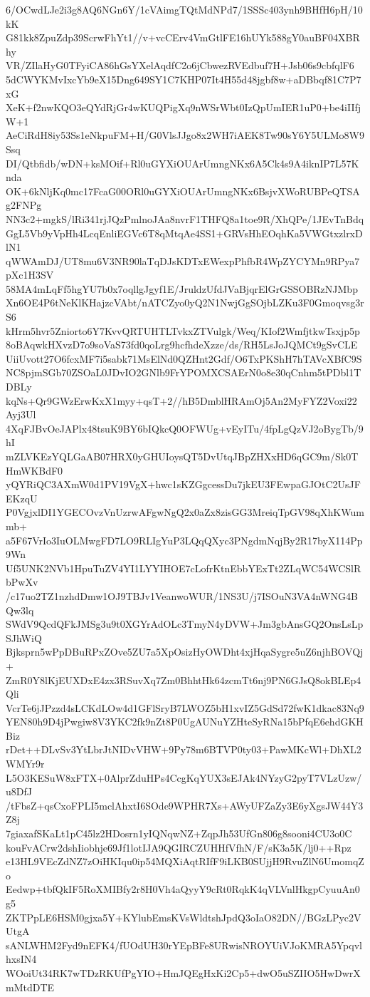 6/OCwdLJe2i3g8AQ6NGn6Y/1cVAimgTQtMdNPd7/1SSSc403ynh9BHfH6pH/10kK
G81kk8ZpuZdp39ScrwFhYt1//v+vcCErv4VmGtlFE16hUYk588gY0auBF04XBRhy
VR/ZIlaHyG0TFyiCA86hGsYXelAqdfC2o6jCbwezRVEdbuf7H+Jsb06s9cbfqlF6
5dCWYKMvIxcYb9eX15Dng649SY1C7KHP07It4H55d48jgbf8w+aDBbqf81C7P7xG
XeK+f2nwKQO3eQYdRjGr4wKUQPigXq9nWSrWbt0IzQpUmIER1uP0+be4iIIfjW+1
AeCiRdH8iy53Ss1eNkpuFM+H/G0VlsJJgo8x2WH7iAEK8Tw90sY6Y5ULMo8W9Ssq
DI/Qtbfidb/wDN+ksMOif+Rl0uGYXiOUArUmngNKx6A5Ck4s9A4iknIP7L57Knda
OK+6kNljKq0mc17FcaG00ORl0uGYXiOUArUmngNKx6BsjvXWoRUBPeQTSAg2FNPg
NN3c2+mgkS/lRi341rjJQzPmlnoJAa8nvrF1THFQ8a1toe9R/XhQPe/1JEvTnBdq
GgL5Vb9yVpHh4LcqEnliEGVc6T8qMtqAe4SS1+GRVsHhEOqhKa5VWGtxzlrxDlN1
qWWAmDJ/UT8mu6V3NR90laTqDJsKDTxEWexpPhfbR4WpZYCYMn9RPya7pXc1H3SV
58MA4mLqFf5hgYU7b0x7oqllgJgyf1E/JruldzUfdJVaBjqrElGrGSSOBRzNJMbp
Xn6OE4P6tNeKlKHajzcVAbt/nATCZyo0yQ2N1NwjGgSOjbLZKu3F0Gmoqvsg3rS6
kHrm5hvr5Zniorto6Y7KvvQRTUHTLTvkxZTVulgk/Weq/KIof2WmfjtkwTsxjp5p
8oBAqwkHXvzD7o9soVaS73fd0qoLrg9hcfhdeXzze/ds/RH5LsJoJQMCt9gSvCLE
UiiUvott27O6fcxMF7i5sabk71MsElNd0QZHnt2Gdf/O6TxPKShH7hTAVcXBfC9S
NC8pjmSGb70ZSOaL0JDvIO2GNlb9FrYPOMXCSAErN0o8e30qCnhm5tPDbl1TDBLy
kqNs+Qr9GWzErwKxX1myy+qsT+2//hB5DmblHRAmOj5An2MyFYZ2Voxi22Ayj3Ul
4XqFJBvOeJAPlx48tsuK9BY6bIQkcQ0OFWUg+vEyITu/4fpLgQzVJ2oBygTb/9hI
mZLVKEzYQLGaAB07HRX0yGHUIoysQT5DvUtqJBpZHXxHD6qGC9m/Sk0THmWKBdF0
yQYRiQC3AXmW0d1PV19VgX+hwc1sKZGgcessDu7jkEU3FEwpaGJOtC2UsJFEKzqU
P0VgjxlDI1YGECOvzVnUzrwAFgwNgQ2x0aZx8zisGG3MreiqTpGV98qXhKWummb+
a5F67VrIo3IuOLMwgFD7LO9RLIgYuP3LQqQXyc3PNgdmNqjBy2R17byX114Pp9Wn
Uf5UNK2NVb1HpuTuZV4YI1LYYIHOE7cLofrKtnEbbYExTt2ZLqWC54WCSlRbPwXv
/c17uo2TZ1nzhdDmw1OJ9TBJv1VeanwoWUR/1NS3U/j7ISOuN3VA4nWNG4BQw3lq
SWdV9QcdQFkJMSg3u9t0XGYrAdOLc3TmyN4yDVW+Jm3gbAnsGQ2OnsLsLpSJhWiQ
Bjksprn5wPpDBuRPxZOve5ZU7a5XpOsizHyOWDht4xjHqaSygre5uZ6njhBOVQj+
ZmR0Y8lKjEUXDxE4zx3RSuvXq7Zm0BhhtHk64zcmTt6nj9PN6GJsQ8okBLEp4Qli
VcrTe6jJPzzd4sLCKdLOw4d1GFlSryB7LWOZ5bH1xvIZ5GdSd72fwK1dkac83Nq9
YEN80h9D4jPwgiw8V3YKC2fk9nZt8P0UgAUNuYZHteSyRNa15bPfqE6ehdGKHBiz
rDet++DLvSv3YtLbrJtNIDvVHW+9Py78m6BTVP0ty03+PawMKcWl+DhXL2WMYr9r
L5O3KESuW8xFTX+0AlprZduHPs4CcgKqYUX3sEJAk4NYzyG2pyT7VLzUzw/u8DfJ
/tFbsZ+qsCxoFPLI5mclAhxtI6SOde9WPHR7Xs+AWyUFZaZy3E6yXgsJW44Y3Z8j
7giaxafSKaLt1pC45lz2HDosrn1yIQNqwNZ+ZqpJh53UfGn806g8sooni4CU3o0C
kouFvACrw2dshIiobhje69Jf1lotIJA9QGIRCZUHHfVfhN/F/sK3a5K/lj0++Rpz
e13HL9VEcZdNZ7zOiHKIqu0ip54MQXiAqtRIfF9iLKB0SUjjH9RvuZlN6UmomqZo
Eedwp+tbfQkIF5RoXMIBfy2r8H0Vh4aQyyY9cRt0RqkK4qVLVnlHkgpCyuuAn0g5
ZKTPpLE6HSM0gjxa5Y+KYlubEmsKVsWldtshJpdQ3oIaO82DN//BGzLPyc2VUtgA
sANLWHM2Fyd9nEFK4/fUOdUH30rYEpBFe8URwisNROYUiVJoKMRA5YpqvlhxsIN4
WOoiUt34RK7wTDzRKUfPgYIO+HmJQEgHxKi2Cp5+dwO5uSZIIO5HwDwrXmMtdDTE
